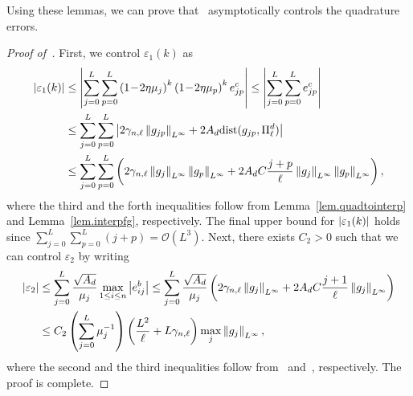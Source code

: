 Using these lemmas, we can prove that~ asymptotically controls the quadrature errors.


\begin{proof}[Proof of~]
First, we control $\varepsilon_1(k)$ as
\begin{align*}
    \left|\varepsilon_1(k)\right| &\leq \left|\sum_{j=0}^L \sum_{p=0}^L \left(1\!-\!2\eta\mu_j\right)^k \left(1\!-\!2\eta\mu_p\right)^k e^c_{jp}\right| \leq \left|\sum_{j=0}^L \sum_{p= 0}^L e^c_{jp}\right| \\
    &\leq \sum_{j=0}^L \sum_{p= 0}^L \left|2\gamma_{n,\ell} \left\lVert g_{jp}\right\rVert_{L^\infty} + 2A_d \text{dist}(g_{jp},\Pi^d_{\ell})\right| \\
    &\leq \sum_{j=0}^L \sum_{p= 0}^L \left(2\gamma_{n,\ell} \left\lVert g_j\right\rVert_{L^\infty}\left\lVert g_p\right\rVert_{L^\infty} + 2A_d C \frac{j+p}{\ell}\left\lVert g_j\right\rVert_{L^\infty}\left\lVert g_p\right\rVert_{L^\infty}\right),
\end{align*}
where the third and the forth inequalities follow from Lemma~\ref{lem.quadtointerp} and Lemma~\ref{lem.interpfg}, respectively. The final upper bound for $  \left|\varepsilon_1(k)\right|$ holds since $\sum_{j=0}^L \sum_{p=0}^L (j+p) = \mathcal{O}(L^3)$. Next, there exists $C_2 > 0$ such that we can control $\varepsilon_2$ by writing
\begin{align*}
    \left|\varepsilon_2\right| &\leq \sum_{j=0}^L \frac{\sqrt{A_d}}{\mu_j} \max_{1 \leq i \leq n} \left|e^b_{i j}\right| \leq \sum_{j=0}^L \frac{\sqrt{A_d}}{\mu_j} \left(2\gamma_{n,\ell} \left\lVert g_j\right\rVert_{L^\infty} + 2A_d C \frac{j+1}{\ell} \left\lVert g_j\right\rVert_{L^\infty}\right) \\
    &\leq C_2 \left(\sum_{j=0}^L \mu_j^{-1}\right) \left(\frac{L^2}{\ell} + L\gamma_{n,\ell}\right) \max_j \left\lVert g_j\right\rVert_{L^\infty},
\end{align*}
where the second and the third inequalities follow from~ and~, respectively. The proof is complete.
\end{proof}


